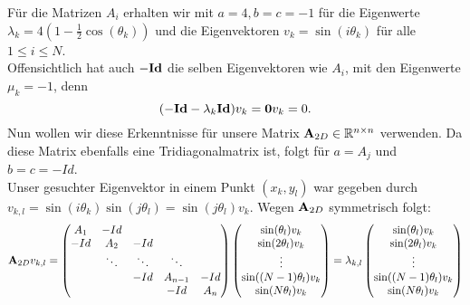 Für die Matrizen $A_{i}$ erhalten wir mit $a = 4, b = c = -1$ für die Eigenwerte $\lambda_{k} = 4 (1 - \frac{1}{2} \cos(\theta_{k}))$ und die Eigenvektoren $v_{k} = \sin(i\theta_{k})$ für alle $1 \le i \le N$.\\
Offensichtlich hat auch $-{\textbf{Id}}$ die selben Eigenvektoren wie $A_{i}$, mit den Eigenwerte $\mu_{k} = -1$, denn
\begin{equation}
(-{\textbf{Id}} - \lambda_{k}{\textbf{Id}}) v_{k} = {\textbf{0}} v_{k} = 0.
\end{equation}
Nun wollen wir diese Erkenntnisse für unsere Matrix ${\textbf{A}}_{2D} \in \mathbb{R}^{n \times n}$ verwenden. Da diese Matrix ebenfalls eine Tridiagonalmatrix ist, folgt für $a = A_{j}$ und $b = c = -Id$.\\
Unser gesuchter Eigenvektor in einem Punkt $(x_{k},y_{l})$ war gegeben durch $v_{k,l} = \sin(i\theta_{k}) \sin(j\theta_{l}) = \sin(j\theta_{l})v_{k}$.  Wegen ${\textbf{A}}_{2D}$ symmetrisch folgt:
\begin{equation}
{\textbf{A}}_{2D}v_{k,l} = 
\begin{pmatrix}
A_{1} & -Id\\
-Id & A_{2} & -Id\\
    & \ddots & \ddots & \ddots\\
   	&		 & -Id    & A_{n-1} & -Id\\
   	&		 &		  & -Id    & A_{n}
\end{pmatrix}
\begin{pmatrix}
\sin(\theta_{l}) v_{k}\\
\sin(2\theta_{l}) v_{k}\\
\vdots\\
\sin((N-1)\theta_{l}) v_{k}\\
\sin(N\theta_{l}) v_{k}\\
\end{pmatrix}
= \lambda_{k,l}
\begin{pmatrix}
\sin(\theta_{l}) v_{k}\\
\sin(2\theta_{l}) v_{k}\\
\vdots\\
\sin((N-1)\theta_{l}) v_{k}\\
\sin(N\theta_{l}) v_{k}\\
\end{pmatrix}\notag
\end{equation}

